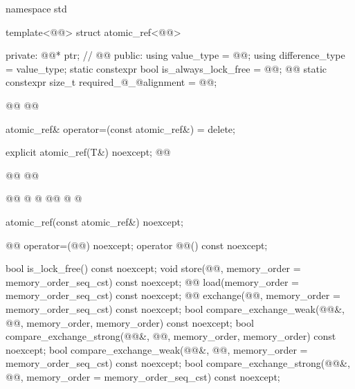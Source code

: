 \begin{codeblock}
namespace std {
  template<@@> struct atomic_ref<@@> {
  private:
    @@* ptr;  // \expos
    @@
  public:
    using value_type = @@;
    using difference_type = value_type;
    static constexpr bool is_always_lock_free = @@;
    @@
    static constexpr size_t required_@_@alignment = @@;

    @@
    @@

    atomic_ref& operator=(const atomic_ref&) = delete;

    explicit atomic_ref(T&) noexcept;
    @@
    
    @@
    @@
    
    @@
    @  @
    @@
    @  @

    atomic_ref(const atomic_ref&) noexcept;

    @@ operator=(@@) noexcept;
    operator @@() const noexcept;

    bool is_lock_free() const noexcept;
    void store(@@, memory_order = memory_order_seq_cst) const noexcept;
    @@ load(memory_order = memory_order_seq_cst) const noexcept;
    @@ exchange(@@,
                            memory_order = memory_order_seq_cst) const noexcept;
    bool compare_exchange_weak(@@&, @@,
                               memory_order, memory_order) const noexcept;
    bool compare_exchange_strong(@@&, @@,
                                 memory_order, memory_order) const noexcept;
    bool compare_exchange_weak(@@&, @@,
                               memory_order = memory_order_seq_cst) const noexcept;
    bool compare_exchange_strong(@@&, @@,
                                 memory_order = memory_order_seq_cst) const noexcept;

}}
\end{codeblock}

